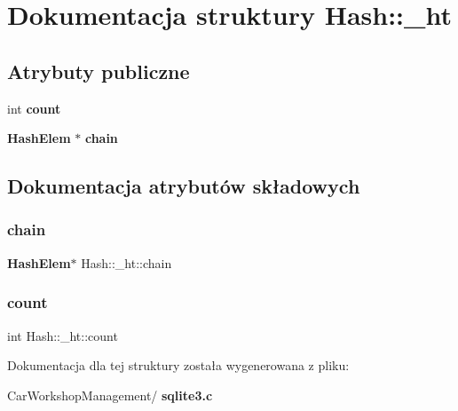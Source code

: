 \section{Dokumentacja struktury Hash\+::\+\_\+ht}
\label{struct_hash_1_1__ht}
\subsection*{Atrybuty publiczne}
\begin{DoxyCompactItemize}
\item 
int \textbf{ count}
\item 
\textbf{ Hash\+Elem} $\ast$ \textbf{ chain}
\end{DoxyCompactItemize}


\subsection{Dokumentacja atrybutów składowych}
\mbox{\label{struct_hash_1_1__ht_a56fc145e7d38d9440d85ab2ea63a48ac}} 
\subsubsection{chain}
{\footnotesize\ttfamily \textbf{ Hash\+Elem}$\ast$ Hash\+::\+\_\+ht\+::chain}

\mbox{\label{struct_hash_1_1__ht_a0677191178b6c7c5c6c2880f41cf24b1}} 
\subsubsection{count}
{\footnotesize\ttfamily int Hash\+::\+\_\+ht\+::count}



Dokumentacja dla tej struktury została wygenerowana z pliku\+:\begin{DoxyCompactItemize}
\item 
Car\+Workshop\+Management/\textbf{ sqlite3.\+c}\end{DoxyCompactItemize}
